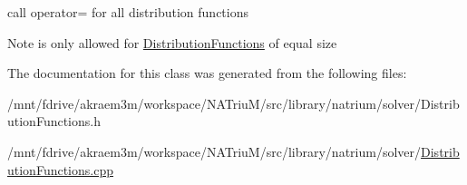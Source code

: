 call operator= for all distribution functions \begin{DoxyNote}{Note}
is only allowed for \hyperlink{classnatrium_1_1DistributionFunctions}{DistributionFunctions} of equal size 
\end{DoxyNote}


The documentation for this class was generated from the following files:\begin{DoxyCompactItemize}
\item 
/mnt/fdrive/akraem3m/workspace/NATriuM/src/library/natrium/solver/DistributionFunctions.h\item 
/mnt/fdrive/akraem3m/workspace/NATriuM/src/library/natrium/solver/\hyperlink{DistributionFunctions_8cpp}{DistributionFunctions.cpp}\end{DoxyCompactItemize}
